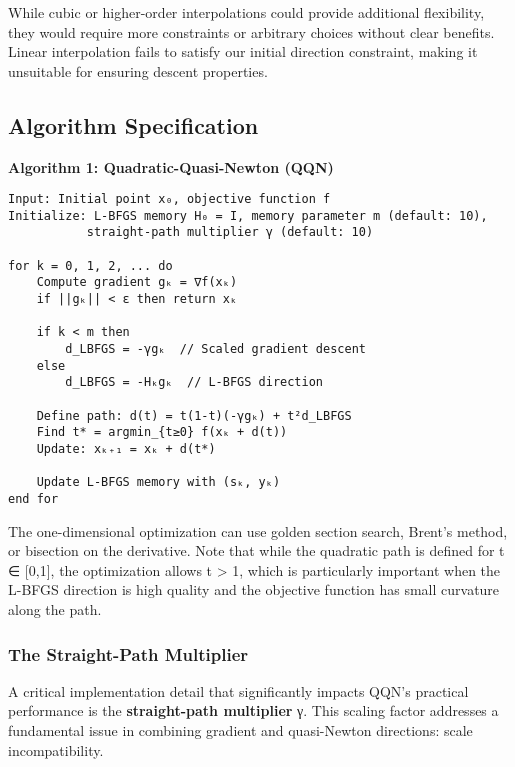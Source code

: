 While cubic or higher-order interpolations could provide additional flexibility, they would require more constraints or arbitrary choices without clear benefits.
Linear interpolation fails to satisfy our initial direction constraint, making it unsuitable for ensuring descent properties.

\hypertarget{algorithm-specification}{%
\subsection{Algorithm Specification}\label{algorithm-specification}}

\textbf{Algorithm 1: Quadratic-Quasi-Newton (QQN)}

\begin{verbatim}
Input: Initial point x₀, objective function f
Initialize: L-BFGS memory H₀ = I, memory parameter m (default: 10),
           straight-path multiplier γ (default: 10)

for k = 0, 1, 2, ... do
    Compute gradient gₖ = ∇f(xₖ)
    if ||gₖ|| < ε then return xₖ

    if k < m then
        d_LBFGS = -γgₖ  // Scaled gradient descent
    else
        d_LBFGS = -Hₖgₖ  // L-BFGS direction

    Define path: d(t) = t(1-t)(-γgₖ) + t²d_LBFGS
    Find t* = argmin_{t≥0} f(xₖ + d(t))
    Update: xₖ₊₁ = xₖ + d(t*)

    Update L-BFGS memory with (sₖ, yₖ)
end for
\end{verbatim}

The one-dimensional optimization can use golden section search, Brent's method, or bisection on the derivative. Note that while the quadratic path is defined for t ∈ {[}0,1{]}, the optimization allows t \textgreater{} 1, which is particularly important when the L-BFGS direction is high quality and the objective function has small curvature along the path.

\hypertarget{the-straight-path-multiplier}{%
\subsubsection{The Straight-Path Multiplier}\label{the-straight-path-multiplier}}

A critical implementation detail that significantly impacts QQN's practical performance is the \textbf{straight-path multiplier} γ.
This scaling factor addresses a fundamental issue in combining gradient and quasi-Newton directions: scale incompatibility.

